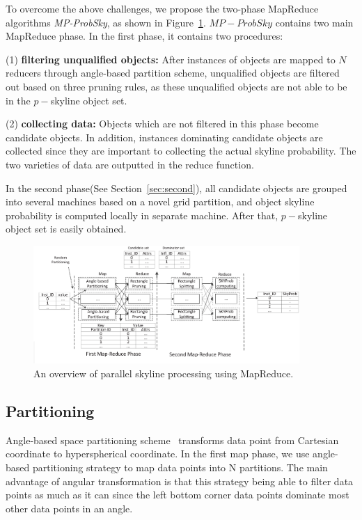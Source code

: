 To overcome the above challenges, we propose the two-phase MapReduce algorithms \textit{MP-ProbSky}, as shown in Figure~\ref{figure:framework}. $MP-ProbSky$ contains two main MapReduce phase. In the first phase, it contains two procedures:

(1) \textbf{filtering unqualified objects:} After instances of objects are mapped to $N$ reducers through angle-based partition scheme, unqualified objects are filtered out based on three pruning rules, as these unqualified objects are not able to be in the $p-$skyline object set. 

(2) \textbf{collecting data:}
Objects which are not filtered in this phase become candidate objects. In addition, instances dominating candidate objects are collected since they are important to collecting the actual skyline probability. The two varieties of data are outputted in the reduce function. 

In the second phase(See Section~\ref{sec:second}), all candidate objects are grouped into several machines based on a novel grid partition, and object skyline probability is computed locally in separate machine. After that, $p-$skyline object set is easily obtained.
\begin{figure}[t]
\centering
  \includegraphics[width=0.9\textwidth]{figs/framework.eps}
  \vspace*{-10pt}
  \caption{An overview of parallel skyline processing using MapReduce.}
  \vspace*{-15pt}
  \label{figure:framework}
\end{figure}

\subsection{Partitioning}

Angle-based space partitioning scheme~\cite{ref:AngularPartition} transforms data point from Cartesian coordinate to hyperspherical coordinate. In the first map phase, we use angle-based partitioning strategy to map data points into N partitions. The main advantage of angular transformation is that this strategy being able to filter data points as much as it can since the left bottom corner data points dominate most other data points in an angle.

